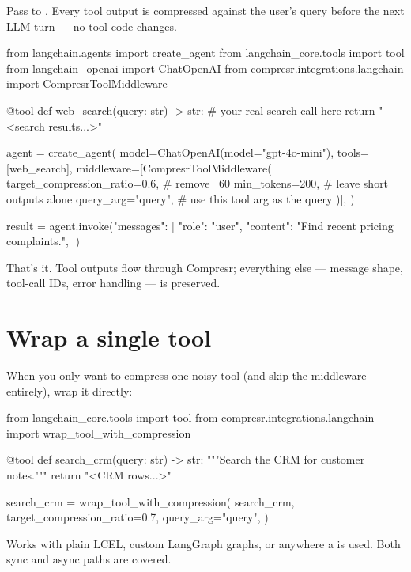 \documentclass[10pt]{article}
\begin{document}
Pass  to .
Every tool output is compressed against the user's query before the next
LLM turn — no tool code changes.

\begin{pycode}
from langchain.agents import create_agent
from langchain_core.tools import tool
from langchain_openai import ChatOpenAI
from compresr.integrations.langchain import CompresrToolMiddleware

@tool
def web_search(query: str) -> str:
    # your real search call here
    return "<search results...>"

agent = create_agent(
    model=ChatOpenAI(model="gpt-4o-mini"),
    tools=[web_search],
    middleware=[CompresrToolMiddleware(
        target_compression_ratio=0.6,   # remove ~60%
        min_tokens=200,                 # leave short outputs alone
        query_arg="query",              # use this tool arg as the query
    )],
)

result = agent.invoke({"messages": [
    {"role": "user", "content": "Find recent pricing complaints."},
]})
\end{pycode}

That's it. Tool outputs flow through Compresr; everything else — message
shape, tool-call IDs, error handling — is preserved.

\section{Wrap a single tool}

When you only want to compress one noisy tool (and skip the middleware
entirely), wrap it directly:

\begin{pycode}
from langchain_core.tools import tool
from compresr.integrations.langchain import wrap_tool_with_compression

@tool
def search_crm(query: str) -> str:
    """Search the CRM for customer notes."""
    return "<CRM rows...>"

search_crm = wrap_tool_with_compression(
    search_crm,
    target_compression_ratio=0.7,
    query_arg="query",
)
\end{pycode}

Works with plain LCEL, custom LangGraph graphs, or anywhere a
 is used. Both sync and async paths are
covered.
\end{document}
